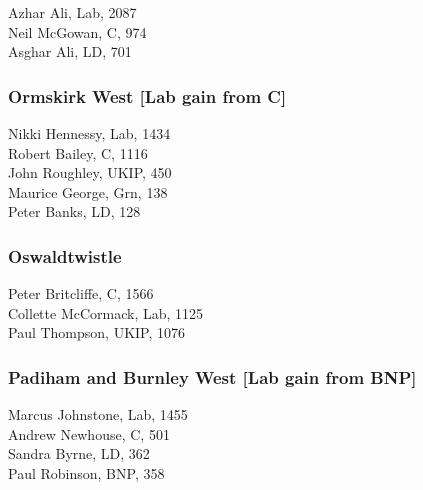 \documentclass[a4paper,openany,10pt]{book}
\begin{document}


Azhar Ali, Lab, 2087\\
Neil McGowan, C, 974\\
Asghar Ali, LD, 701\\


\subsubsection*{Ormskirk West \hspace*{\fill}\nolinebreak[1]%
\enspace\hspace*{\fill}
[Lab gain from C]}



Nikki Hennessy, Lab, 1434\\
Robert Bailey, C, 1116\\
John Roughley, UKIP, 450\\
Maurice George, Grn, 138\\
Peter Banks, LD, 128\\


\subsubsection*{Oswaldtwistle}



Peter Britcliffe, C, 1566\\
Collette McCormack, Lab, 1125\\
Paul Thompson, UKIP, 1076\\


\subsubsection*{Padiham and Burnley West \hspace*{\fill}\nolinebreak[1]%
\enspace\hspace*{\fill}
[Lab gain from BNP]}



Marcus Johnstone, Lab, 1455\\
Andrew Newhouse, C, 501\\
Sandra Byrne, LD, 362\\
Paul Robinson, BNP, 358\\
\end{document}
